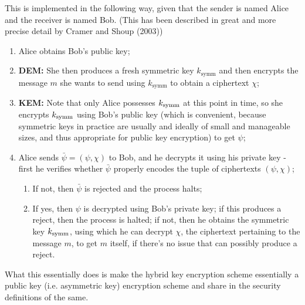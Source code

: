 This is implemented in the following way, given that the sender is named Alice and the receiver is named Bob. (This has been described in great and more precise detail by Cramer and Shoup (2003)\cite{cryptoeprint:2001:108})
\begin{enumerate}
\item Alice obtains Bob's public key;
\item \textbf{DEM:} She then produces a fresh symmetric key $k_\text{symm}$ and then encrypts the message $m$ she wants to send using $k_\text{symm}$ to obtain a ciphertext $\chi$;
\item \textbf{KEM:} Note that only Alice possesses $k_{\text{symm}}$ at this point in time, so she encrypts $k_{\text{symm}}$ using Bob's public key (which is convenient, because symmetric keys in practice are usually and ideally of small and manageable sizes, and thus appropriate for public key encryption) to get $\psi$;
\item Alice sends $\bar\psi=(\psi,\chi)$ to Bob, and he decrypts it using his private key - first he verifies whether $\bar\psi$ properly encodes the tuple of ciphertexts $(\psi,\chi)$;
\begin{enumerate}
\item If not, then $\bar\psi$ is rejected and the process halts;
\item If yes, then $\psi$ is decrypted using Bob's private key; if this produces a reject, then the process is halted; if not, then he obtains the symmetric key $k_{\text{symm}}$, using which he can decrypt $\chi$, the ciphertext pertaining to the message $m$, to get $m$ itself, if there's no issue that can possibly produce a reject.
\end{enumerate}
\end{enumerate}

What this essentially does is make the hybrid key encryption scheme essentially a public key (i.e. asymmetric key) encryption scheme and share in the security definitions of the same.
\label{sec:intro}
